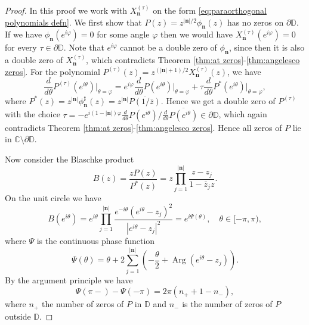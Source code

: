 \documentclass[reqno,centertags,11pt,draft]{amsart}
\newcommand{\C}{\mathbb C}
\newcommand{\D}{\mathbb{D}}
\renewcommand{\d}{\partial}
\newcommand{\abs}[1]{\left|#1\right|}
\newcommand{\brkt}[1]{\left(#1\right)}
\begin{document}
\begin{proof}
    In this proof we work with $X_{\bm{n}}^{(\tau)}$ on the form \eqref{eq:paraorthogonal polynomials defn}. We first show that $P(z) = z^{\abs{\bm{n}}/2}\phi_{\bm{n}}(z)$ has no zeros on $\d\D$. If we have $\phi_{\bm{n}}(e^{i\varphi}) = 0$ for some angle $\varphi$ then we would have $X_{\bm{n}}^{(\tau)}(e^{i\varphi}) = 0$ for every $\tau \in \d\D$. Note that $e^{i\varphi}$ cannot be a double zero of $\phi_{\bm{n}}$, since then it is also a double zero of $X_{\bm{n}}^{(\tau)}$, which contradicts Theorem \ref{thm:at zeros}-\ref{thm:angelesco zeros}. For the polynomial $P^{(\tau)}(z) = z^{(\abs{\bm{n}}+1)/2}X_{\bm{n}}^{(\tau)}(z)$, we have
    \begin{equation}
        \frac{d}{d\theta}P^{(\tau)}(e^{i\theta})\Bigg|_{\theta = \varphi} = e^{i\varphi}\frac{d}{d\theta}P(e^{i\theta})\Bigg|_{\theta = \varphi} + \tau\frac{d}{d\theta}P^*(e^{i\theta})\Bigg|_{\theta = \varphi},
    \end{equation}
    where $P^*(z) = z^{\abs{\bm{n}}}\phi_{\bm{n}}^\sharp(z) = z^{\abs{\bm{n}}}\overline{P(1/\bar{z})}$. Hence we get a double zero of $P^{(\tau)}$ with the choice $\tau = -e^{i(1-\abs{\bm{n}})\varphi}\frac{d}{d\theta}P(e^{i\theta})/\frac{d}{d\theta}\overline{P(e^{i\theta})} \in \d\D$, which again contradicts Theorem \ref{thm:at zeros}-\ref{thm:angelesco zeros}. Hence all zeros of $P$ lie in $\C\setminus\d\D$.

    Now consider the Blaschke product
    \begin{equation}
        B(z) = \frac{zP(z)}{P^*(z)} = z\prod_{j = 1}^{\abs{\bm{n}}}\frac{z-z_j}{1-\bar{z}_j z}.
    \end{equation}
    On the unit circle we have
    \begin{equation}
        B(e^{i\theta}) = e^{i\theta}\prod_{j = 1}^{\abs{\bm{n}}}\frac{e^{-i\theta}(e^{i\theta}-z_j)^2}{\abs{e^{i\theta}-z_j}^2} = e^{i\Psi(\theta)}, \quad \theta \in [-\pi,\pi),
    \end{equation}
    where $\Psi$ is the continuous phase function
    \begin{equation}
        \Psi(\theta) = \theta + 2\sum_{j = 1}^{\abs{\bm{n}}}\brkt{-\frac{\theta}{2} + \operatorname{Arg}(e^{i\theta}-z_j)}.
    \end{equation}
    By the argument principle we have 
    \begin{equation}
        \Psi(\pi-) - \Psi(-\pi) = 2\pi(n_++1-n_-), 
    \end{equation}
    where $n_+$ the number of zeros of $P$ in $\D$ and $n_-$ is the number of zeros of $P$ outside $\D$. 


\end{proof}
\end{document}
